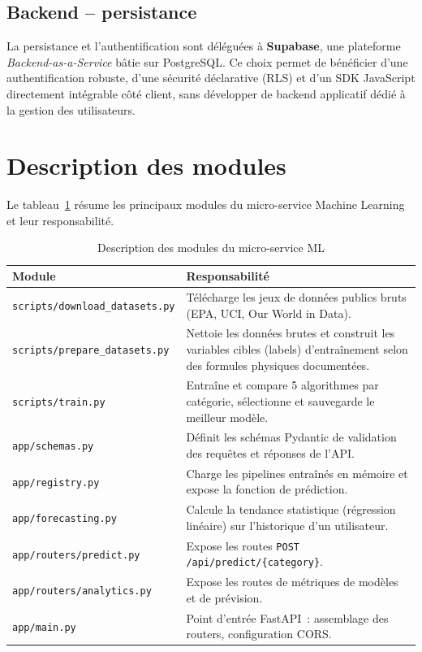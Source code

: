 \subsection{Backend -- persistance}
La persistance et l'authentification sont déléguées à \textbf{Supabase}, une plateforme \textit{Backend-as-a-Service} bâtie sur PostgreSQL. Ce choix permet de bénéficier d'une authentification robuste, d'une sécurité déclarative (RLS) et d'un SDK JavaScript directement intégrable côté client, sans développer de backend applicatif dédié à la gestion des utilisateurs.

\section{Description des modules}

Le tableau~\ref{tab:modules} résume les principaux modules du micro-service Machine Learning et leur responsabilité.

\begin{table}[H]
\centering
\caption{Description des modules du micro-service ML}
\label{tab:modules}
\begin{tabular}{|p{3.6cm}|p{9.5cm}|}
\hline
\rowcolor{isiBlue!15}
\textbf{Module} & \textbf{Responsabilité} \\
\hline
\texttt{scripts/download\_datasets.py} & Télécharge les jeux de données publics bruts (EPA, UCI, Our World in Data). \\ \hline
\texttt{scripts/prepare\_datasets.py} & Nettoie les données brutes et construit les variables cibles (labels) d'entraînement selon des formules physiques documentées. \\ \hline
\texttt{scripts/train.py} & Entraîne et compare 5 algorithmes par catégorie, sélectionne et sauvegarde le meilleur modèle. \\ \hline
\texttt{app/schemas.py} & Définit les schémas Pydantic de validation des requêtes et réponses de l'API. \\ \hline
\texttt{app/registry.py} & Charge les pipelines entraînés en mémoire et expose la fonction de prédiction. \\ \hline
\texttt{app/forecasting.py} & Calcule la tendance statistique (régression linéaire) sur l'historique d'un utilisateur. \\ \hline
\texttt{app/routers/predict.py} & Expose les routes \texttt{POST /api/predict/\{category\}}. \\ \hline
\texttt{app/routers/analytics.py} & Expose les routes de métriques de modèles et de prévision. \\ \hline
\texttt{app/main.py} & Point d'entrée FastAPI~: assemblage des routers, configuration CORS. \\ \hline
\end{tabular}
\end{table}

